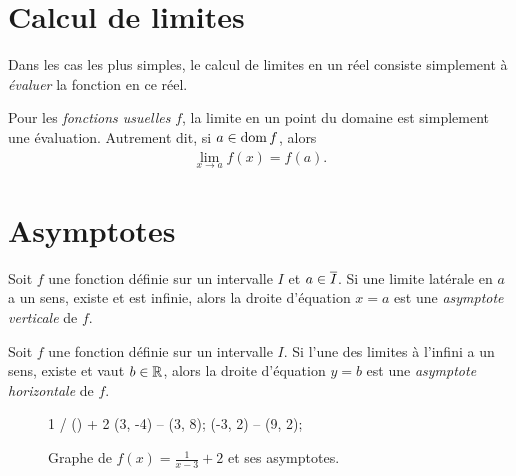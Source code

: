 \documentclass[main.tex]{subfiles}
\begin{document}
\section{Calcul de limites}

Dans les cas les plus simples,
le calcul de limites en un réel consiste simplement à \emph{évaluer} la fonction en ce réel.

\begin{proposition}
    Pour les \emph{fonctions usuelles} $f$,
    la limite en un point du domaine est simplement une évaluation.
    Autrement dit,
    si $a \in \operatorname{dom} f$, alors
    \begin{align}
        \lim_{x \to a} f(x) = f(a).
    \end{align}
\end{proposition}

\section{Asymptotes}

\begin{definition}

    Soit $f$ une fonction définie sur un intervalle $I$ et $a \in \overline{I}$.
    Si une limite latérale en $a$ a un sens, existe et est infinie,
    alors la droite d'équation $x = a$ est
    une \emph{asymptote verticale} de $f$.
\end{definition}

\begin{definition}

    Soit $f$ une fonction définie sur un intervalle $I$.
    Si l'une des limites à l'infini a un sens, existe et vaut $b \in \mathbb{R}$,
    alors la droite d'équation $y = b$ est
    une \emph{asymptote horizontale} de $f$.
\end{definition}

\begin{figure}
    \centering
    \begin{plot}{0.5}{-3}{-4}{9}{8}
         {1 / () + 2}
        \drawline (3, -4) -- (3, 8);
        \drawline (-3, 2) -- (9, 2);
    \end{plot}
    \caption{Graphe de $f(x) = \frac 1 {x - 3} + 2$ et ses asymptotes.}
\end{figure}
\end{document}
